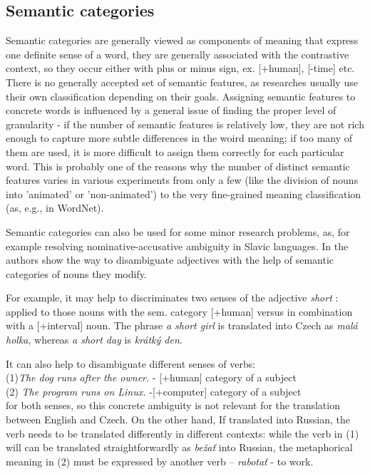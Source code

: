 \documentclass[letterpaper]{article}
\newcommand{\todofn}[1] {
 \footnote{\textbf{TODO : #1}}}
\begin{document}
\subsection{Semantic categories}
Semantic categories are generally viewed as components of meaning
that express one definite sense of a word, they are generally associated
with the contrastive context, so they occur either with plus or minus
sign, ex. [+human], [-time] etc. 
There is no generally accepted set of semantic features, as researches
usually use their own classification depending on their goals. Assigning 
semantic features to concrete words is influenced by a general issue 
of finding the proper level of granularity - if the number of semantic features is relatively 
low, they are not rich enough to capture more subtle differences in the woird meaning;
if too many of them are used, it is more difficult to assign them correctly
for each particular word. This is probably one of the reasons why the 
number of distinct semantic features varies in various experiments 
from only a few (like
the division of nouns into 'animated' or 'non-animated') to the very
fine-grained meaning classification (as, e.g., in WordNet).

Semantic categories can also be used for some minor research problems, as, for example
resolving nominative-accusative ambiguity in Slavic languages.
In \cite{principled_disam} the authors show the way to disambiguate adjectives
with the help of semantic categories of nouns they modify. 

For example, it may help 
to discriminates two senses of the  adjective \textit{short}
: applied to those nouns with the sem. category [+human] versus in combination
with a [+interval] noun. The phrase \textit{a short girl} is translated
into Czech as \textit{mal\'{a} holka}, whereas \textit{a short day} is \textit{kr\'{a}tk\'{y} den}.

It can also help to disambiguate different senses of verbs:\\ 
(1)\textit{The dog runs after the owner.} - [+human] category of a subject\\
(2) \textit{The program runs on Linux.} -[+computer] category of a subject \\
for both senses, so this concrete ambiguity is not relevant for
the translation between English and Czech. On the other hand, If translated into Russian, the verb needs to be translated differently in different contexts: while the verb in (1) will can be translated straightforwardly as \textit{be\v{z}a\v{t}} into Russian,
the metaphorical meaning in (2) must be expressed by another verb -- \textit{rabota\v{t}} - to work.
\end{document}
